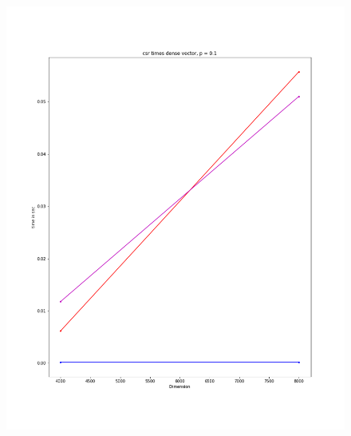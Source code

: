 \documentclass[12pt]{article}
\begin{document}
\begin{figure}[h]
  \includegraphics[scale = 0.16]{csr_dv_1.png}
\end{figure}
\end{document}

